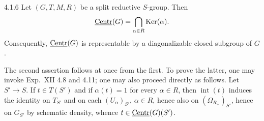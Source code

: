 \begin{corollary}{4.1.6}\label{XXII.4.1.6}
Let $(G,T,M,R)$ be a split reductive $S$-group. Then
\[
\underline{\mathrm{Centr}}(G)=\bigcap_{\alpha\in R}\operatorname{Ker}(\alpha).
\]
{\renewcommand{\thefootnote}{(12)}}%
Consequently, $\underline{\mathrm{Centr}}(G)$ is representable by a diagonalizable closed subgroup of $G$.
\end{corollary}
The second assertion follows at once from the first. To prove the latter, one may invoke Exp.~XII 4.8 and 4.11; one may also proceed directly as follows. {\renewcommand{\thefootnote}{(13)}}Let $S'\to S$. If $t\in T(S')$ and if $\alpha(t)=1$ for every $\alpha\in R$, then $\operatorname{int}(t)$ induces the identity on $T_{S'}$ and on each $(U_\alpha)_{S'}$, $\alpha\in R$, hence also on $(\Omega_{R_+})_{S'}$, hence on $G_{S'}$ by schematic density, whence $t\in\underline{\mathrm{Centr}}(G)(S')$.

